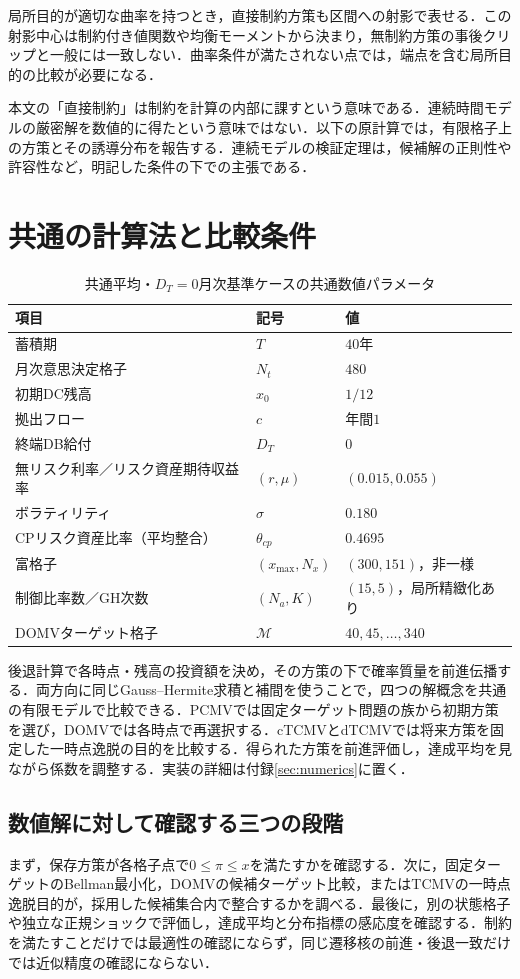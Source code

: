 \documentclass[10pt,a4paper]{article}
\theoremstyle{plain}
\theoremstyle{definition}
\begin{document}
局所目的が適切な曲率を持つとき，直接制約方策も区間への射影で表せる．この射影中心は制約付き値関数や均衡モーメントから決まり，無制約方策の事後クリップと一般には一致しない．曲率条件が満たされない点では，端点を含む局所目的の比較が必要になる．

本文の「直接制約」は制約を計算の内部に課すという意味である．連続時間モデルの厳密解を数値的に得たという意味ではない．以下の原計算では，有限格子上の方策とその誘導分布を報告する．連続モデルの検証定理は，候補解の正則性や許容性など，明記した条件の下での主張である．
\section{共通の計算法と比較条件}\label{sec:method-main}
\begin{table}[htbp]
\centering
\caption{共通平均・$D_T=0$月次基準ケースの共通数値パラメータ}
\label{tab:all-strategy-params}
\begin{tabular}{lll}
\toprule
項目 & 記号 & 値 \\
\midrule
蓄積期 & $T$ & $40$年 \\
月次意思決定格子 & $N_t$ & $480$ \\
初期DC残高 & $x_0$ & $1/12$ \\
拠出フロー & $c$ & 年間$1$ \\
終端DB給付 & $D_T$ & $0$ \\
無リスク利率／リスク資産期待収益率 & $(r,\mu)$ & $(0.015,0.055)$ \\
ボラティリティ & $\sigma$ & $0.180$ \\
CPリスク資産比率（平均整合） & $\theta_{cp}$ & $0.4695$ \\
富格子 & $(x_{\max},N_x)$ & $(300,151)$，非一様 \\
制御比率数／GH次数 & $(N_a,K)$ & $(15,5)$，局所精緻化あり \\
DOMVターゲット格子 & $\mathcal M$ & $40,45,\ldots,340$ \\
\bottomrule
\end{tabular}
\end{table}
後退計算で各時点・残高の投資額を決め，その方策の下で確率質量を前進伝播する．両方向に同じGauss--Hermite求積と補間を使うことで，四つの解概念を共通の有限モデルで比較できる．PCMVでは固定ターゲット問題の族から初期方策を選び，DOMVでは各時点で再選択する．cTCMVとdTCMVでは将来方策を固定した一時点逸脱の目的を比較する．得られた方策を前進評価し，達成平均を見ながら係数を調整する．実装の詳細は付録\ref{sec:numerics}に置く．

\subsection{数値解に対して確認する三つの段階}
まず，保存方策が各格子点で$0\leq\pi\leq x$を満たすかを確認する．次に，固定ターゲットのBellman最小化，DOMVの候補ターゲット比較，またはTCMVの一時点逸脱目的が，採用した候補集合内で整合するかを調べる．最後に，別の状態格子や独立な正規ショックで評価し，達成平均と分布指標の感応度を確認する．制約を満たすことだけでは最適性の確認にならず，同じ遷移核の前進・後退一致だけでは近似精度の確認にならない．
\end{document}
